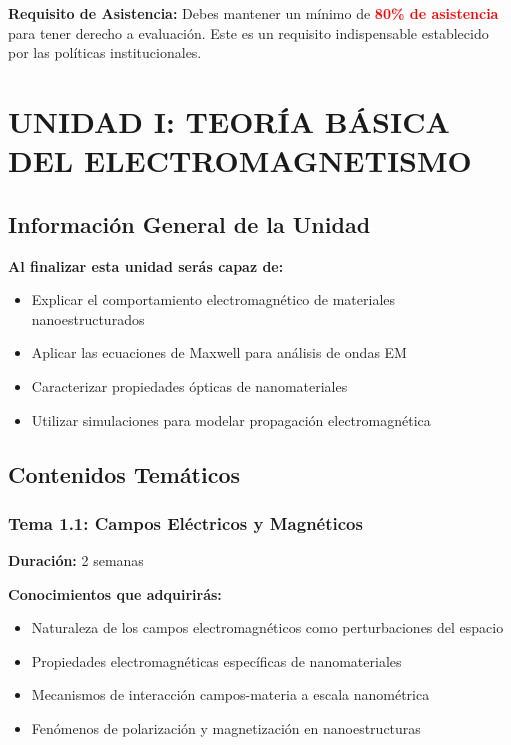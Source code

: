 \documentclass[12pt,a4paper]{book}
\newcommand{\importante}[1]{\textcolor{red}{\textbf{#1}}}
\begin{document}
	\begin{notabox}
		\textbf{Requisito de Asistencia:} Debes mantener un mínimo de \importante{80\% de asistencia} para tener derecho a evaluación. Este es un requisito indispensable establecido por las políticas institucionales.
	\end{notabox}
	
	\chapter{UNIDAD I: TEORÍA BÁSICA DEL ELECTROMAGNETISMO}
	
	\section{Información General de la Unidad}
	
	
		\textbf{Al finalizar esta unidad serás capaz de:}
		\begin{itemize}
			\item Explicar el comportamiento electromagnético de materiales nanoestructurados
			\item Aplicar las ecuaciones de Maxwell para análisis de ondas EM
			\item Caracterizar propiedades ópticas de nanomateriales
			\item Utilizar simulaciones para modelar propagación electromagnética
		\end{itemize}
	
	\section{Contenidos Temáticos}
	
	\subsection{Tema 1.1: Campos Eléctricos y Magnéticos}
	\textbf{Duración:} 2 semanas
	
	\begin{saberbox}
		\textbf{Conocimientos que adquirirás:}
		\begin{itemize}
			\item Naturaleza de los campos electromagnéticos como perturbaciones del espacio
			\item Propiedades electromagnéticas específicas de nanomateriales
			\item Mecanismos de interacción campos-materia a escala nanométrica
			\item Fenómenos de polarización y magnetización en nanoestructuras
		\end{itemize}
	\end{saberbox}
	
\end{document}
